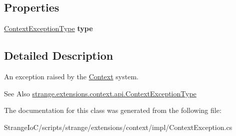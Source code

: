\subsection*{Properties}
\begin{DoxyCompactItemize}
\item 
\hypertarget{classstrange_1_1extensions_1_1context_1_1impl_1_1_context_exception_ad053db1d001cdf99851d92038c86740e}{\hyperlink{namespacestrange_1_1extensions_1_1context_1_1api_a60b937d6295cc72fe4b26e4f9d671283}{Context\-Exception\-Type} {\bfseries type}}\label{classstrange_1_1extensions_1_1context_1_1impl_1_1_context_exception_ad053db1d001cdf99851d92038c86740e}

\end{DoxyCompactItemize}


\subsection{Detailed Description}
An exception raised by the \hyperlink{classstrange_1_1extensions_1_1context_1_1impl_1_1_context}{Context} system. 

\begin{DoxySeeAlso}{See Also}
\hyperlink{namespacestrange_1_1extensions_1_1context_1_1api_a60b937d6295cc72fe4b26e4f9d671283}{strange.\-extensions.\-context.\-api.\-Context\-Exception\-Type} 
\end{DoxySeeAlso}


The documentation for this class was generated from the following file\-:\begin{DoxyCompactItemize}
\item 
Strange\-Io\-C/scripts/strange/extensions/context/impl/Context\-Exception.\-cs\end{DoxyCompactItemize}
